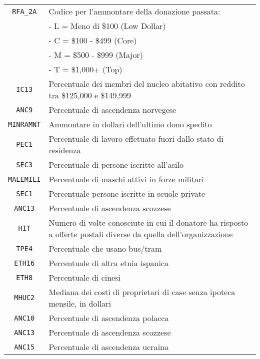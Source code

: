 \begin{center}
\begin{tabularx}{\textwidth}{|c|X|}
	\hline
	\texttt{RFA\_2A} & Codice per l'ammontare della donazione passata: \\ &
		- L = Meno di \$100 (Low Dollar) \\ &
		- C = \$100 - \$499  (Core) \\ &
		- M = \$500 - \$999 (Major) \\ &
		- T = \$1,000+ (Top) \\

 \hline
	
	\texttt{IC13} & Percentuale dei membri del nucleo abitativo con reddito tra \$125,000 e \$149,999\\ \hline
	
	\texttt{ANC9} & Percentuale di ascendenza norvegese\\ \hline
	
	\texttt{MINRAMNT} & Ammontare in dollari dell'ultimo dono spedito\\ \hline
	
	\texttt{PEC1} & Percentuale di lavoro effetuato fuori dallo stato di residenza\\ \hline
	
	\texttt{SEC3} & Percentuale di persone iscritte all'asilo\\ \hline
	
	\texttt{MALEMILI} & Percentuale di maschi attivi in forze militari\\ \hline
	
	\texttt{SEC1} & Percentuale persone iscritte in scuole private\\ \hline
	
	\texttt{ANC13} & Percentuale di ascendenza scozzese\\ \hline
	
	\texttt{HIT} & Numero di volte conosciute in cui il donatore ha risposto a offerte postali diverse da quella dell'organizzazione\\ \hline
	
	\texttt{TPE4} & Percentuale che usano bus/tram\\ \hline
	
	\texttt{ETH16} & Percentuale di altra etnia ispanica\\ \hline
	
	\texttt{ETH8} & Percentuale di cinesi\\ \hline
	
	\texttt{MHUC2} & Mediana dei costi di proprietari di case senza ipoteca mensile, in dollari\\ \hline
	
	\texttt{ANC10} & Percentuale di ascendenza polacca\\ \hline
	
	\texttt{ANC13} & Percentuale di ascendenza scozzese\\ \hline
	
	\texttt{ANC15} & Percentuale di ascendenza ucraina\\ \hline
\end{tabularx}
\end{center}

